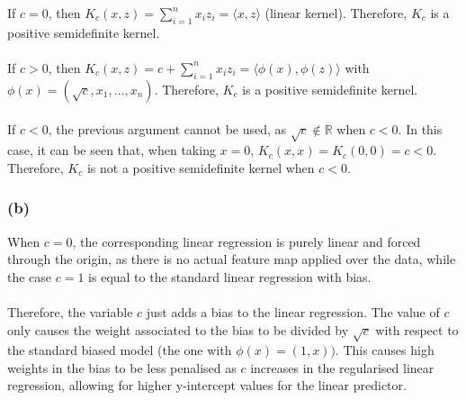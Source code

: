 \documentclass[11pt,a4paper]{article}
\begin{document}
If $c = 0$, then $K_c(x,z) = \sum_{i=1}^n x_i z_i = \langle x, z \rangle$ (linear kernel). Therefore, $K_c$ is a positive semidefinite kernel.
\\\\
If $c > 0$, then $K_c(x,z) = c + \sum_{i=1}^n x_i z_i = \langle\phi(x), \phi(z)\rangle$ with $\phi(x) = (\sqrt{c}, x_1, \ldots, x_n)$. Therefore, $K_c$ is a positive semidefinite kernel.
\\\\
If $c < 0$, the previous argument cannot be used, as $\sqrt{c} \notin \mathbb{R}$ when $c < 0$. In this case, it can be seen that, when taking $x=0$, $K_c(x, x) = K_c(0, 0) = c < 0$. Therefore, $K_c$ is not a positive semidefinite kernel when $c < 0$.
\subsubsection*{(b)}
When $c=0$, the corresponding linear regression is purely linear and forced through the origin, as there is no actual feature map applied over the data, while the case $c=1$ is equal to the standard linear regression with bias.
\\\\
Therefore, the variable $c$ just adds a bias to the linear regression. The value of $c$ only causes the weight associated to the bias to be divided by $\sqrt{c}$ with respect to the standard biased model (the one with $\phi(x) = (1, x))$. This causes high weights in the bias to be less penalised as $c$ increases in the regularised linear regression, allowing for higher y-intercept values for the linear predictor.
\end{document}
